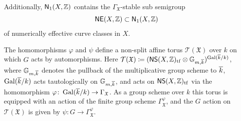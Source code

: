 \documentclass[twoside,leqno]{article}
\numberwithin{equation}{section}
\theoremstyle{plain}
\theoremstyle{definition}
\begin{document}
Additionally, $\mathsf{N}_{1}(X,\mathbb Z)$ contains the
$\Gamma_{\mathfrak{X}}$-stable sub semigroup
\[
\mathsf{NE}(X,\mathbb Z) \subset \mathsf{N}_{1}(X,\mathbb Z) 
\]
of numerically effective curve classes in $X$.

The homomorphisms $\varphi$ and $\psi$ define a non-split affine torus
$\mathcal{T}(\mathfrak{X})$ over $k$ on which $G$ acts by automorphisms.  Here
$\mathcal{T}(\mathfrak{X}) \coloneqq (\mathsf{NS}(X,\mathbb Z)_{\operatorname{tf}}\otimes
\mathbb{G}_{m,\overline{k}})^{\operatorname{Gal}(\overline{k}/k)}$, where $\mathbb{G}_{m,\overline{k}}$
denotes the pullback of the multiplicative group scheme to $\overline{k}$,
$\operatorname{Gal}(\overline{k}/k)$ acts tautologically on $\mathbb{G}_{m,\overline{k}}$, and
acts on $\mathsf{NS}(X,\mathbb Z)_{\operatorname{tf}}$ via the homomorphism $\varphi \colon \operatorname{Gal}(\overline{k}/k)
\to \Gamma_{\mathfrak{X}}$. As a group scheme over $k$ this torus is
equipped with an action of the finite group scheme
$\Gamma^{\varphi}_{\mathfrak{X}}$, and the $G$ action on $\mathcal{T}(\mathfrak{X})$
is given by $\psi \colon G \to \Gamma^{\varphi}_{\mathfrak{X}}$. 

\bigskip
\end{document}
